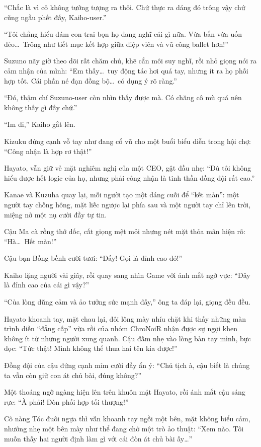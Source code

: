 \documentclass[../main.tex]{subfiles}
\begin{document}
``Chắc là vì cô không tưởng tượng ra thôi. Chứ thực ra dáng đó trông vậy chứ cũng ngầu phết đấy, Kaiho-user.''

``Tôi chẳng hiểu đám con trai bọn họ đang nghĩ cái gì nữa. Vừa bắn vừa uốn dẻo\dots\ Trông như tiết mục kết hợp giữa điệp viên và vũ công ballet hơn!''

Suzuno nãy giờ theo dõi rất chăm chú, khẽ cắn môi suy nghĩ, rồi nhỏ giọng nói ra cảm nhận của mình: ``Em thấy\dots\ tuy động tác hơi quá tay, nhưng ít ra họ phối hợp tốt. Cái phần né đạn đồng bộ\dots\ có dụng ý rõ ràng.''

``Đó, thậm chí Suzuno-user còn nhìn thấy được mà. Có chăng cô mù quá nên không thấy gì đấy chứ.''

``Im đi,'' Kaiho gắt lên.

Kizuku đứng cạnh vỗ tay như đang cổ vũ cho một buổi biểu diễn trong hội chợ: ``Công nhận là hợp rơ thật!''

Hayato, vẫn giữ vẻ mặt nghiêm nghị của một CEO, gật đầu nhẹ: ``Dù tôi không hiểu được hết logic của họ, nhưng phải công nhận là tinh thần đồng đội rất cao.''

Kanae và Kuzuha quay lại, mỗi người tạo một dáng cuối để ``kết màn'': một người tay chống hông, mặt liếc ngược lại phía sau và một người tay chỉ lên trời, miệng nở một nụ cười đầy tự tin.

Cậu Ma cà rồng thở dốc, cất giọng mệt mỏi nhưng nét mặt thỏa mãn hiện rõ: ``Hà\dots\ Hết màn!''

Cậu bạn Bồng bềnh cười tươi: ``Đấy! Gọi là đỉnh cao đó!''

Kaiho lặng người vài giây, rồi quay sang nhìn Game với ánh mắt ngờ vực: ``Đây là đỉnh cao của cái gì vậy?''

``Của lòng dũng cảm và ảo tưởng sức mạnh đấy,'' ông ta đáp lại, giọng đều đều.

Hayato khoanh tay, mặt chau lại, đôi lông mày nhíu chặt khi thấy những màn trình diễn ``đẳng cấp'' vừa rồi của nhóm ChroNoiR nhận được sự ngợi khen không ít từ những người xung quanh. Cậu đấm nhẹ vào lòng bàn tay mình, bực dọc: ``Tức thật! Mình không thể thua hai tên kia được!''

Đồng đội của cậu đứng cạnh mỉm cười đầy ẩn ý: ``Chủ tịch à, cậu biết là chúng ta vẫn còn giữ con át chủ bài, đúng không?''

Một thoáng ngỡ ngàng hiện lên trên khuôn mặt Hayato, rồi ánh mắt cậu sáng rực: ``À phải! Đòn phối hợp tối thượng!''

Cô nàng Tóc đuôi ngựa thì vẫn khoanh tay ngồi một bên, mặt không biểu cảm, nhướng nhẹ một bên mày như thể đang chờ một trò ảo thuật: ``Xem nào. Tôi muốn thấy hai người định làm gì với cái đòn át chủ bài ấy\dots''
\end{document}
